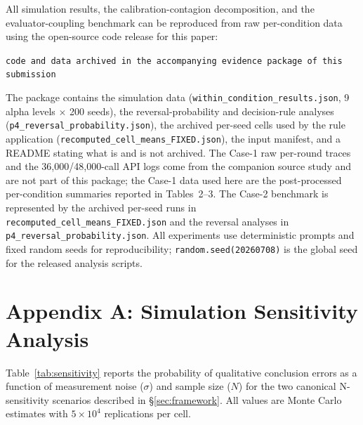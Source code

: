 \documentclass[11pt]{article}
\begin{document}
All simulation results, the calibration-contagion decomposition, and the evaluator-coupling benchmark can be reproduced from raw per-condition data using the open-source code release for this paper:
\begin{center}
\texttt{code and data archived in the accompanying evidence package of this submission}
\end{center}
The package contains the simulation data (\texttt{within\_condition\_results.json}, 9 alpha levels $\times$ 200 seeds), the reversal-probability and decision-rule analyses (\texttt{p4\_reversal\_probability.json}), the archived per-seed cells used by the rule application (\texttt{recomputed\_cell\_means\_FIXED.json}), the input manifest, and a README stating what is and is not archived. The Case-1 raw per-round traces and the 36{,}000/48{,}000-call API logs come from the companion source study and are not part of this package; the Case-1 data used here are the post-processed per-condition summaries reported in Tables~2--3. The Case-2 benchmark is represented by the archived per-seed runs in \texttt{recomputed\_cell\_means\_FIXED.json} and the reversal analyses in \texttt{p4\_reversal\_probability.json}. All experiments use deterministic prompts and fixed random seeds for reproducibility; \texttt{random.seed(20260708)} is the global seed for the released analysis scripts.

\section*{Appendix A: Simulation Sensitivity Analysis}

Table~\ref{tab:sensitivity} reports the probability of qualitative conclusion errors as a function of measurement noise ($\sigma$) and sample size ($N$) for the two canonical N-sensitivity scenarios described in \S\ref{sec:framework}. All values are Monte Carlo estimates with $5{\times}10^4$ replications per cell.
\end{document}
